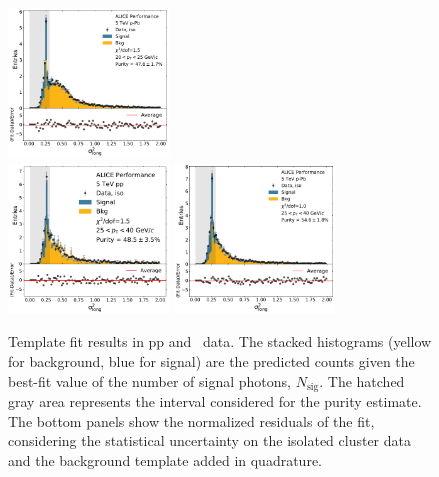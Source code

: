 \begin{figure}[h]
\includegraphics[width=0.38\textwidth]{Purity/tf-example-p-Pb-cluster_Lambda-20-25.pdf}
\\
\includegraphics[width=0.38\textwidth]{Purity/tf-example-pp-cluster_Lambda-25-40.pdf}
\includegraphics[width=0.38\textwidth]{Purity/tf-example-p-Pb-cluster_Lambda-25-40.pdf}
\caption{Template fit results in pp and \pPb~data. The stacked histograms (yellow for background, blue for signal) are the predicted counts given the best-fit value of the number of signal photons, $N_{\mathrm{sig}}$. The hatched gray area represents the interval considered for the purity estimate. The bottom panels show the normalized residuals of the fit, considering the statistical uncertainty on the isolated cluster data and the background template added in quadrature. }
\label{TemplatefitResults_Preliminary}
\end{figure}

